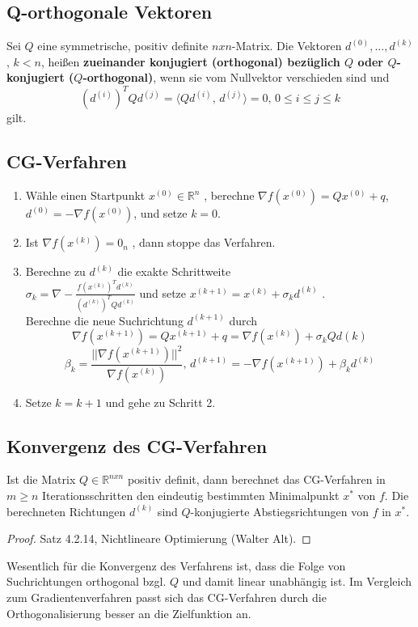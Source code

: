 \subsection{Q-orthogonale Vektoren}
\begin{Definition}
	Sei $Q$ eine symmetrische, positiv definite $n x n$-Matrix. Die Vektoren $d^{(0)} , \dots , d^{(k)}$, $k < n$, heißen \textbf{zueinander konjugiert (orthogonal) bezüglich $Q$ oder $Q$-konjugiert ($Q$-orthogonal)}, wenn sie vom
	Nullvektor verschieden sind und $$(d^{(i)})^TQd^{(j)} = \langle Qd^{(i)} \text{, }d^{(j)}\rangle = 0 \text{, } 0 \leq i \le j \leq k$$ gilt.

\end{Definition}

\subsection{CG-Verfahren}
\begin{enumerate}
	\item Wähle einen Startpunkt $x^{(0)} \in \mathbb{R}^n$ , berechne $\nabla f(x^{(0)}) = Qx^{(0)} + q$, $d^{(0)} = -\nabla f(x^{(0)})$, und setze $k = 0$.
	\item Ist $\nabla f(x^{(k)}) = 0_n$ , dann stoppe das Verfahren.
	\item Berechne zu $d^{(k)}$ die exakte Schrittweite \\
	$	\sigma_k =\nabla -\frac{f(x^{(k)})^T d^{(k)}}{(d^{(k)})^TQd^{(k)}}$ und setze
	$x^{(k+1)} = x^{(k)} + \sigma_k d^{(k)}$ .\\
	Berechne die neue Suchrichtung $d^{(k+1)}$ durch
$$\nabla f(x^{(k+1)}) = Qx^{(k+1)}+q = \nabla f(x^{(k)})+\sigma_kQd{(k)}$$
$$\beta_k = \frac{||\nabla f(x^{(k+1)})||^2}{\nabla f(x^{(k)})}\text{, } d^{(k+1)} = -\nabla f(x^{(k+1)}) + \beta_kd^{(k)}$$
	\item Setze $k = k + 1$ und gehe zu Schritt 2.
\end{enumerate}


\subsection{Konvergenz des CG-Verfahren}
\begin{Theorem}
Ist die Matrix $Q \in \mathbb{R}^{n x n}$ positiv definit, dann berechnet das CG-Verfahren in $m \geq n$ Iterationsschritten den eindeutig bestimmten Minimalpunkt $x^{*}$ von $f$. Die berechneten Richtungen $d^{(k)}$ sind $Q$-konjugierte Abstiegsrichtungen von $f$ in $x^{*}$.
\end{Theorem}
\begin{proof}
Satz 4.2.14, Nichtlineare Optimierung (Walter Alt). 
\end{proof}
Wesentlich für die Konvergenz des Verfahrens ist, dass die Folge von
Suchrichtungen orthogonal bzgl. $Q$ und damit linear unabhängig ist. Im
Vergleich zum Gradientenverfahren passt sich das CG-Verfahren durch
die Orthogonalisierung besser an die Zielfunktion an.
